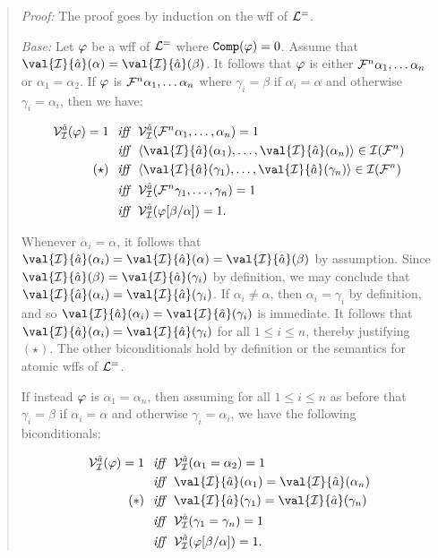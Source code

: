 \begin{quote} 
  \textit{Proof:}
  The proof goes by induction on the wff of $\mathcal{L}^{=}$. 

  \textit{Base:} Let $\varphi$ be a wff of $\mathcal{L}^{=}$ where $\texttt{Comp}(\varphi)=0$.
  Assume that $\val{\I}{\va{a}}(\alpha)=\val{\I}{\va{a}}(\beta)$.
  It follows that $\varphi$ is either $\mathcal{F}^n\alpha_1,\ldots\alpha_n$ or $\alpha_1=\alpha_2$.
  If $\varphi$ is $\mathcal{F}^n\alpha_1,\ldots\alpha_n$ where $\gamma_i=\beta$ if $\alpha_i=\alpha$ and otherwise $\gamma_i=\alpha_i$, then we have:

  \vspace{-.2in}
  \begin{align*}
    \VV{\I}{\va{a}}(\metaA)=1 &\textit{ ~iff~ } \VV{\I}{\va{a}}(\F^n\alpha_1,\ldots,\alpha_n)=1\\
      &\textit{ ~iff~ } \tuple{\val{\I}{\va{a}}(\alpha_1),\ldots,\val{\I}{\va{a}}(\alpha_n)}\in\I(\F^n)\\
      (\star) &\textit{ ~iff~ } \tuple{\val{\I}{\va{a}}(\gamma_1),\ldots,\val{\I}{\va{a}}(\gamma_n)}\in\I(\F^n)\\
      &\textit{ ~iff~ } \VV{\I}{\va{a}}(\F^n\gamma_1,\ldots,\gamma_n)=1\\
      &\textit{ ~iff~ } \VV{\I}{\va{a}}(\metaA\unisub{\beta}{\alpha})=1.
  \end{align*}

  Whenever $\alpha_i=\alpha$, it follows that $\val{\I}{\va{a}}(\alpha_i)=\val{\I}{\va{a}}(\alpha)=\val{\I}{\va{a}}(\beta)$ by assumption.
  Since $\val{\I}{\va{a}}(\beta)=\val{\I}{\va{a}}(\gamma_i)$ by definition, we may conclude that $\val{\I}{\va{a}}(\alpha_i)=\val{\I}{\va{a}}(\gamma_i)$.
  If $\alpha_i\neq\alpha$, then $\alpha_i=\gamma_i$ by definition, and so $\val{\I}{\va{a}}(\alpha_i)=\val{\I}{\va{a}}(\gamma_i)$ is immediate.
  It follows that $\val{\I}{\va{a}}(\alpha_i)=\val{\I}{\va{a}}(\gamma_i)$ for all $1\leq i\leq n$, thereby justifying $(\star)$.
  The other biconditionals hold by definition or the semantics for atomic wffs of $\mathcal{L}^{=}$.

  If instead $\varphi$ is $\alpha_1=\alpha_n$, then assuming for all $1 \leq i \leq n$ as before that $\gamma_i=\beta$ if $\alpha_i=\alpha$ and otherwise $\gamma_i=\alpha_i$, we have the following biconditionals:

  \vspace{-.2in}
  \begin{align*}
    \VV{\I}{\va{a}}(\metaA)=1 &\textit{ ~iff~ } \VV{\I}{\va{a}}(\alpha_1=\alpha_2)=1\\
      &\textit{ ~iff~ } \val{\I}{\va{a}}(\alpha_1)=\val{\I}{\va{a}}(\alpha_n)\\
      (\ast) &\textit{ ~iff~ } \val{\I}{\va{a}}(\gamma_1)=\val{\I}{\va{a}}(\gamma_n)\\
      &\textit{ ~iff~ } \VV{\I}{\va{a}}(\gamma_1=\gamma_n)=1\\
      &\textit{ ~iff~ } \VV{\I}{\va{a}}(\metaA\unisub{\beta}{\alpha})=1.
  \end{align*}


\end{quote}

